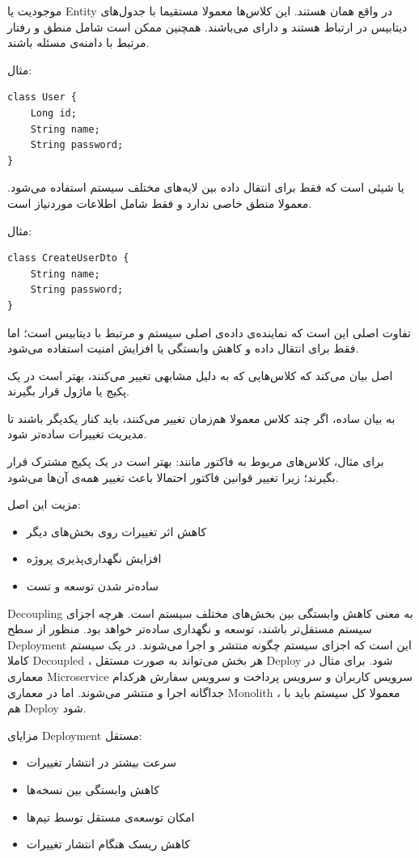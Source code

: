 موجودیت یا Entity 
در واقع همان
 هستند. 
این کلاس‌ها معمولا مستقیما با جدول‌های دیتابیس در ارتباط هستند و دارای  می‌باشند. 
همچنین ممکن است شامل منطق و رفتار مرتبط با دامنه‌ی مسئله باشند.

مثال:
\begin{latin}
\begin{verbatim}
class User {
    Long id;
    String name;
    String password;
}
\end{verbatim}
\end{latin}

 یا  شیئی است که فقط برای انتقال داده بین لایه‌های مختلف سیستم استفاده می‌شود. 
 معمولا منطق خاصی ندارد و فقط شامل اطلاعات موردنیاز است.

مثال:
\begin{latin}
\begin{verbatim}
class CreateUserDto {
    String name;
    String password;
}
\end{verbatim}
\end{latin}

تفاوت اصلی این است که  نماینده‌ی داده‌ی اصلی سیستم و مرتبط با دیتابیس است؛
اما  فقط برای انتقال داده و کاهش وابستگی یا افزایش امنیت استفاده می‌شود.


اصل  بیان می‌کند که کلاس‌هایی که به دلیل مشابهی تغییر می‌کنند، بهتر است در یک پکیج یا ماژول قرار بگیرند.

به بیان ساده، اگر چند کلاس معمولا هم‌زمان تغییر می‌کنند، باید کنار یکدیگر باشند تا مدیریت تغییرات ساده‌تر شود.

برای مثال، کلاس‌های مربوط به فاکتور مانند:
بهتر است در یک پکیج مشترک قرار بگیرند؛
زیرا تغییر قوانین فاکتور احتمالا باعث تغییر همه‌ی آن‌ها می‌شود.

مزیت این اصل:
\begin{itemize}
    \item کاهش اثر تغییرات روی بخش‌های دیگر
    \item افزایش نگهداری‌پذیری پروژه
    \item ساده‌تر شدن توسعه و تست
\end{itemize}

Decoupling به معنی کاهش وابستگی بین بخش‌های مختلف سیستم است. 
هرچه اجزای سیستم مستقل‌تر باشند، توسعه و نگهداری ساده‌تر خواهد بود.
منظور از سطح Deployment این است که اجزای سیستم چگونه منتشر و اجرا می‌شوند.
در یک سیستم کاملا Decoupled ، هر بخش می‌تواند به صورت مستقل Deploy شود.
برای مثال در معماری Microservice
 سرویس کاربران و  سرویس پرداخت و سرویس سفارش
هرکدام جداگانه اجرا و منتشر می‌شوند.
اما در معماری Monolith ، معمولا کل سیستم باید با هم Deploy شود.

مزایای Deployment مستقل:
\begin{itemize}
    \item سرعت بیشتر در انتشار تغییرات
    \item کاهش وابستگی بین نسخه‌ها
    \item امکان توسعه‌ی مستقل توسط تیم‌ها
    \item کاهش ریسک هنگام انتشار تغییرات
\end{itemize}